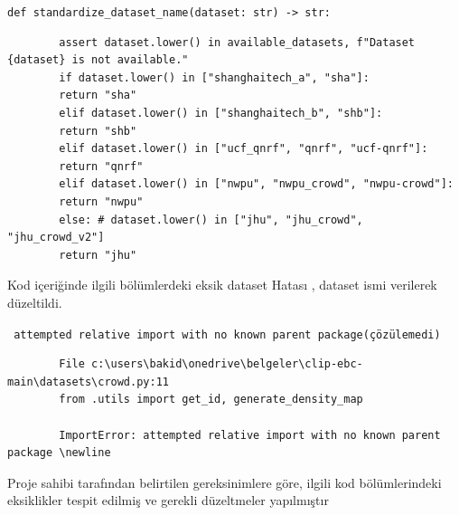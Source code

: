\documentclass[10pt,a4paper]{report}
\begin{document}
	\clearpage
	{\texttt{def standardize\_dataset\_name}}\texttt{(dataset: str) -> str:}
	\begin{verbatim}
		assert dataset.lower() in available_datasets, f"Dataset {dataset} is not available."
		if dataset.lower() in ["shanghaitech_a", "sha"]:
		return "sha"
		elif dataset.lower() in ["shanghaitech_b", "shb"]:
		return "shb"
		elif dataset.lower() in ["ucf_qnrf", "qnrf", "ucf-qnrf"]:
		return "qnrf"
		elif dataset.lower() in ["nwpu", "nwpu_crowd", "nwpu-crowd"]:
		return "nwpu"
		else: # dataset.lower() in ["jhu", "jhu_crowd", "jhu_crowd_v2"]
		return "jhu"
	\end{verbatim}
	
	Kod içeriğinde ilgili bölümlerdeki eksik dataset Hatası , dataset ismi verilerek düzeltildi.
	
	\texttt{ attempted relative import with no known parent package(çözülemedi)}
	\begin{verbatim}
		File c:\users\bakid\onedrive\belgeler\clip-ebc-main\datasets\crowd.py:11
		from .utils import get_id, generate_density_map
		
		ImportError: attempted relative import with no known parent package \newline
	\end{verbatim}
	
	Proje sahibi tarafından belirtilen gereksinimlere göre, ilgili kod bölümlerindeki eksiklikler tespit edilmiş ve gerekli düzeltmeler yapılmıştır
	
	
	
	
	
	
	 
\end{document}
